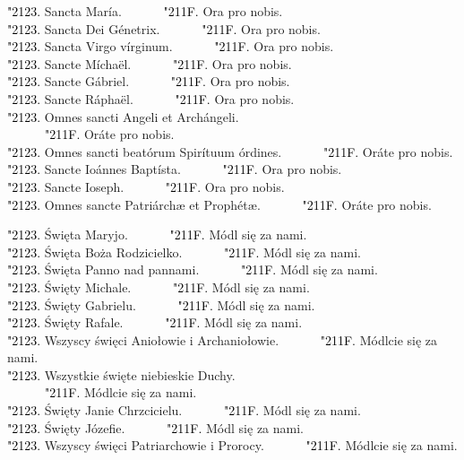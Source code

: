 \documentclass[10pt,a5paper]{book}
\newcommand{\kol}{black}
\newcommand{\textjuni}[1]{{\fontspec{Junicode-Regular}#1}}
\newcommand{\vv}{\textcolor{\kol}{\textjuni{\char"2123. }}}
\newcommand{\rrr}{\newline\textcolor{\kol}{\textjuni{~~~~~~\char"211F. }}}
\newcommand{\oremuss}[2]{
	\begin{sloppypar}
		\begin{paracol}{2}
			\setlength{\columnsep}{0em}
			\begin{leftcolumn}
				#1
			\end{leftcolumn}
			\begin{rightcolumn}
				#2
			\end{rightcolumn}
		\end{paracol}
	\end{sloppypar}}
\begin{document}
						\oremuss{
							\vv Sancta María. \rrr Ora pro nobis.\\
							\vv Sancta Dei Génetrix. \rrr Ora pro nobis.\\
							\vv Sancta Virgo vírginum. \rrr Ora pro nobis.\\
							\vv Sancte Míchaël. \rrr Ora pro nobis.\\
							\vv Sancte Gábriel. \rrr Ora pro nobis.\\
							\vv Sancte Ráphaël. \rrr Ora pro nobis.\\
							\vv Omnes sancti Angeli et Archángeli.\\ \rrr Oráte pro nobis.\\
							\vv Omnes sancti beatórum Spirítuum órdines. \rrr Oráte pro nobis.\\
							\vv Sancte Ioánnes Baptísta. \rrr Ora pro nobis.\\
							\vv Sancte Ioseph. \rrr Ora pro nobis.\\
							\vv Omnes sancte Patriárchæ et Prophétæ. \rrr Oráte pro nobis.}{
							\vv Święta Maryjo. \rrr Módl się za nami.\\
							\vv Święta Boża Rodzicielko. \rrr Módl się za nami.\\
							\vv Święta Panno nad pannami. \rrr Módl się za nami.\\
							\vv Święty Michale. \rrr Módl się za nami.\\
							\vv Święty Gabrielu. \rrr Módl się za nami.\\
							\vv Święty Rafale. \rrr Módl się za nami.\\
							\vv Wszyscy święci Aniołowie i Archaniołowie. \rrr Módlcie się za nami.\\
							\vv Wszystkie święte niebieskie Duchy. \\ \rrr Módlcie się za nami.\\
							\vv Święty Janie Chrzcicielu. \rrr Módl się za nami.\\
							\vv Święty Józefie. \rrr Módl się za nami.\\
							\vv Wszyscy święci Patriarchowie i Prorocy. \rrr Módlcie się za nami.}
						\vspace*{-0.2cm}
\end{document}
